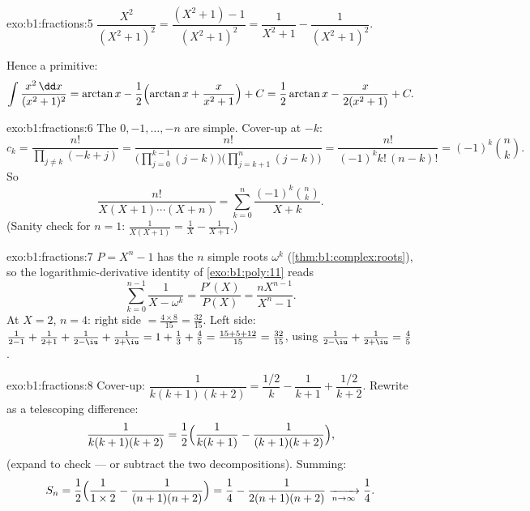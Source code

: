 \begin{solution}{exo:b1:fractions:5}
$\dfrac{X^2}{(X^2+1)^2} = \dfrac{(X^2 + 1) - 1}{(X^2+1)^2} =
\dfrac{1}{X^2+1} - \dfrac{1}{(X^2+1)^2}$.

Hence a primitive:
\[
\int \frac{x^2\,\dd x}{(x^2+1)^2}
= \arctan x - \frac12\Bigl(\arctan x + \frac{x}{x^2+1}\Bigr) + C
= \frac12\arctan x - \frac{x}{2(x^2+1)} + C .
\]
\end{solution}

\begin{solution}{exo:b1:fractions:6}
The  $0, -1, \dots, -n$ are simple. Cover-up at $-k$:
\[
c_k = \frac{n!}{\prod_{j \neq k} (-k + j)}
= \frac{n!}{\bigl(\prod_{j=0}^{k-1}(j - k)\bigr)
\bigl(\prod_{j=k+1}^{n}(j-k)\bigr)}
= \frac{n!}{(-1)^k k!\,(n-k)!} = (-1)^k \binom nk .
\]
So
\[
\frac{n!}{X(X+1)\cdots(X+n)}
= \sum_{k=0}^{n} \frac{(-1)^k \binom nk}{X + k} .
\]
(Sanity check for $n = 1$: $\frac{1}{X(X+1)} = \frac1X -
\frac{1}{X+1}$.)
\end{solution}

\begin{solution}{exo:b1:fractions:7}
$P = X^n - 1$ has the $n$ simple roots $\omega^k$
(\cref{thm:b1:complex:roots}), so the logarithmic-derivative identity
of \cref{exo:b1:poly:11} reads
\[
\sum_{k=0}^{n-1} \frac{1}{X - \omega^k}
= \frac{P'(X)}{P(X)} = \frac{n X^{n-1}}{X^n - 1} .
\]
At $X = 2$, $n = 4$: right side $= \frac{4 \times 8}{15} =
\frac{32}{15}$. Left side: $\frac{1}{2-1} + \frac{1}{2+1} +
\frac{1}{2 - \iu} + \frac{1}{2 + \iu} = 1 + \frac13 + \frac{4}{5} =
\frac{15 + 5 + 12}{15} = \frac{32}{15}$, using $\frac{1}{2-\iu} +
\frac{1}{2+\iu} = \frac{4}{5}$.
\end{solution}

\begin{solution}{exo:b1:fractions:8}
Cover-up: $\dfrac{1}{k(k+1)(k+2)} = \dfrac{1/2}{k} - \dfrac{1}{k+1} +
\dfrac{1/2}{k+2}$. Rewrite as a telescoping difference:
\[
\frac{1}{k(k+1)(k+2)}
= \frac12\Bigl(\frac{1}{k(k+1)} - \frac{1}{(k+1)(k+2)}\Bigr),
\]
(expand to check --- or subtract the two decompositions). Summing:
\[
S_n = \frac12\Bigl(\frac{1}{1 \times 2} - \frac{1}{(n+1)(n+2)}\Bigr)
= \frac14 - \frac{1}{2(n+1)(n+2)}
\xrightarrow[n \to \infty]{} \frac14 .
\]
\end{solution}

